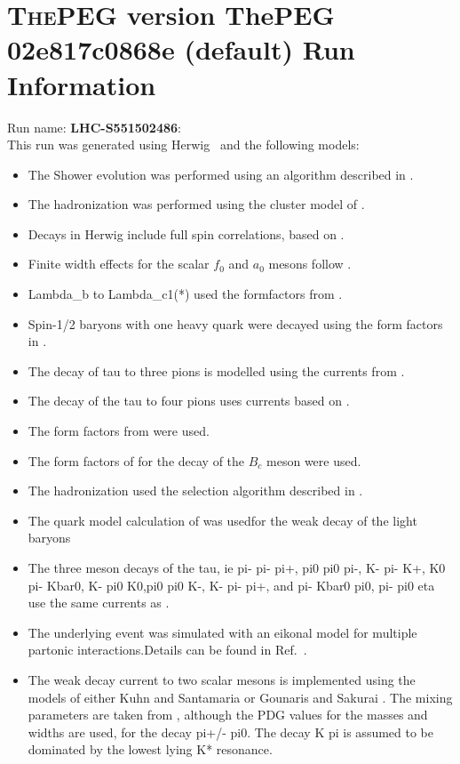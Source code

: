 \documentclass{article}
\begin{document}
\appendix
\section[xxx]{\textsc{ThePEG} version ThePEG 02e817c0868e (default) \cite{ThePEG} Run Information}
Run name: \textbf{LHC-S551502486}:\\
This run was generated using Herwig~\cite{Bahr:2008pv} and the following models:
\begin{itemize}
\item The Shower evolution was performed using an algorithm described in \cite{Marchesini:1983bm,Marchesini:1987cf,Gieseke:2003rz,Bahr:2008pv}.
\item The hadronization was performed using the cluster model of \cite{Webber:1983if}.
\item Decays in Herwig include full spin correlations, based on \cite{Richardson:2001df}.
\item Finite width effects for the scalar $f_0$ and $a_0$ mesons follow \cite{Flatte:1976xu}.
\item Lambda_b to Lambda_c1(*) used the formfactors from \cite{Huang:2000xw}.
\item Spin-1/2 baryons with one heavy quark were decayed using the form factors in \cite{Singleton:1990ye}.
\item The decay of tau to three pions is modelled using the currents from \cite{Asner:1999kj}.
\item The decay of the tau to four pions uses currents based on \cite{Bondar:2002mw}.
\item The form factors from \cite{Ivanov:1996fj} were used.
\item The form factors of \cite{Kiselev:2002vz} for the decay of the $B_c$ meson were used.
\item The hadronization used the selection algorithm described in \cite{Kupco:1998fx}.
\item The quark model calculation of \cite{Schlumpf:1994fb} was usedfor the weak decay of the light baryons
\item The three meson decays of the tau, ie pi- pi- pi+, pi0 pi0 pi-, K- pi- K+, K0 pi- Kbar0, K- pi0 K0,pi0 pi0 K-, K- pi- pi+, and pi- Kbar0 pi0, pi- pi0 eta use the same currents as \cite{Jadach:1993hs,Kuhn:1990ad,Decker:1992kj}.
\item The underlying event was simulated with an eikonal model for multiple partonic interactions.Details can be found in Ref.~\cite{Bahr:2008dy,Bahr:2009ek}.
\item The weak decay current to two scalar mesons is implemented using the models of either Kuhn and Santamaria \cite{Kuhn:1990ad} or Gounaris and Sakurai \cite{Gounaris:1968mw}. The mixing parameters are taken from \cite{Asner:1999kj}, although the PDG values for the masses and widths are used, for the decay pi+/- pi0. The decay K pi is assumed to  be dominated by the lowest lying K* resonance.

\end{itemize}
\end{document}
